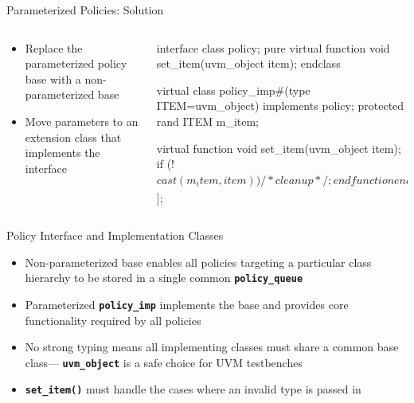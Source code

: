 \documentclass[aspectratio=169]{beamer}
\newcommand{\code}[1]{
  \textbf{\texttt{#1}}
}
\begin{document}
\begin{frame}[fragile]{Parameterized Policies: Solution}
\begin{columns}
\begin{column}{0.3\textwidth}
\begin{itemize}
  \setlength\itemsep{1em}
  \item Replace the parameterized policy base with a non-parameterized base
  \item Move parameters to an extension class that implements the interface
\end{itemize}
\end{column}
\begin{column}{0.6\textwidth}
\scriptsize
\begin{svcode}
interface class policy;
  pure virtual function void set_item(uvm_object item);
endclass

virtual class policy_imp#(type ITEM=uvm_object) implements policy;
  protected rand ITEM m_item;

  virtual function void set_item(uvm_object item);
    if (!$cast(m_item, item)) /* cleanup */;
  endfunction
endclass

typedef policy policy_queue[$];
\end{svcode}
\end{column}
\end{columns}
\end{frame}

\begin{frame}{Policy Interface and Implementation Classes}
\begin{itemize}
  \setlength\itemsep{1em}
  \item Non-parameterized base enables all policies targeting a particular class hierarchy to be stored in a single common \code{policy_queue}
  \item Parameterized \code{policy_imp} implements the base and provides core functionality required by all policies
  \item No strong typing means all implementing classes must share a common base class---\code{uvm_object} is a safe choice for UVM testbenches
  \item \code{set_item()} must handle the cases where an invalid type is passed in
\end{itemize}
\end{frame}
\end{document}
